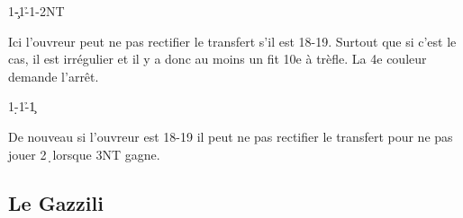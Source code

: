 \documentclass[a4paper]{article}
\begin{document}
\begin{bidtable}
1\c-1\h-1\s-2NT
\end{bidtable}

Ici l'ouvreur peut ne pas rectifier le transfert s'il est 18-19. Surtout que si c'est le cas, il est irrégulier
et il y a donc au moins un fit 10e à trèfle. La 4e couleur demande l'arrêt.

\begin{bidtable}
1\d-1\h-1\c
\end{bidtable}

De nouveau si l'ouvreur est 18-19 il peut ne pas rectifier le transfert pour ne pas jouer 2\d\ lorsque 3NT gagne.

\subsection{Le Gazzili}
\end{document}
